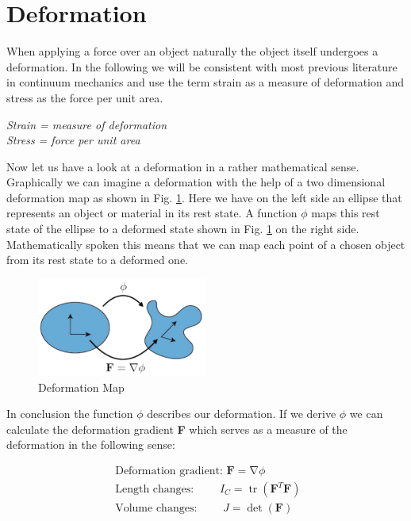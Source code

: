 \section{Deformation}
When applying a force over an object naturally the object itself undergoes a deformation. In the following we will be consistent with most previous literature in continuum mechanics and use the term strain as a measure of deformation and stress as the force per unit area.

\begin{addmargin}[2cm]{2cm}
\textit{Strain = measure of deformation}  \\
\textit{Stress = force per unit area} 
\end{addmargin}




Now let us have a look at a deformation in a rather mathematical sense. Graphically we can imagine a deformation with the help of a two dimensional deformation map as shown in Fig. \ref{fig:deformationmap}. Here we have on the left side an ellipse that represents an object or material in its rest state. A function $\phi$ maps this rest state of the ellipse to a deformed state shown in Fig. \ref{fig:deformationmap} on the right side. Mathematically spoken this means that we can map each point of a chosen object from its rest state to a deformed one.

\begin{figure}[!htbp]
	\centering
	\includegraphics[width=0.5\textwidth]{resources/deformation_map}
	\caption{Deformation Map {\cite{STREAM2018}}}
	\label{fig:deformationmap}
\end{figure}

In conclusion the function $\phi$ describes our deformation. If we derive $\phi$ we can calculate the deformation gradient \textbf{F} which serves as a measure of the deformation in the following sense: 

\[
\begin{array}{l}
{\text { Deformation gradient: }} {\mathbf{F}=\operatorname{\nabla} \phi}
\\
{\text { Length changes: }} {\qquad I_{C}=\operatorname{tr}\left(\mathbf{F}^{T} \mathbf{F}\right)} 
\\ 
{\text { Volume changes: }} {\qquad J=\operatorname{det}(\mathbf{F})}\end{array}
\]

